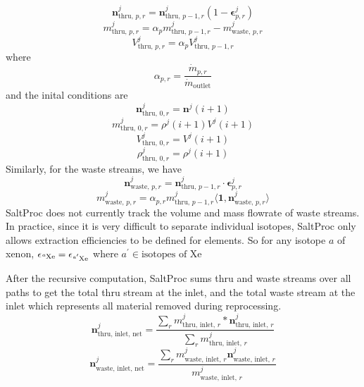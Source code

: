\begin{equation}
    \mathbf{n}^{j}_{\text{thru, }p,r} = \mathbf{n}^{j}_{\text{thru, }p-1,r} (1 - \mathbf{\epsilon}^{j}_{p,r})
\end{equation}
\begin{equation}
    m^{j}_{\text{thru, } p,r} = \alpha_{p} m^{j}_{\text{thru, }p-1,r} - m^{j}_{\text{waste, }p,r}
\end{equation}
\begin{equation}
    V^{j}_{\text{thru, }p,r} = \alpha_{p}V^{j}_{\text{thru, }p-1,r}
\end{equation}
where 
\begin{equation}
    \alpha_{p,r} = \frac{\dot{m}_{p,r}}{\dot{m}_{\text{outlet}}}
\end{equation}
and the inital conditions are 
\begin{equation}
    \mathbf{n}^{j}_{\text{thru, }0,r} = \mathbf{n}^{j}(i+1)
\end{equation}
\begin{equation}
    m^{j}_{\text{thru, }0,r} = \rho^{j}(i+1)V^{j}(i+1)
\end{equation}
\begin{equation}
    V^{j}_{\text{thru, }0,r} = V^{j}(i+1)
\end{equation}
\begin{equation}
    \rho^{j}_{\text{thru, }0,r} = \rho^{j}(i+1)
\end{equation}
Similarly, for the waste streams, we have
\begin{equation}
    \mathbf{n}^{j}_{\text{waste, }p,r} = \mathbf{n}^{j}_{\text{thru, }p-1,r} \cdot \mathbf{\epsilon}^{j}_{p,r}
\end{equation}
\begin{equation}
    m^{j}_{\text{waste, }p,r} = \alpha_{p,r} m^{j}_{\text{thru, }p-1,r} \langle\mathbf{1},\mathbf{n}^{j}_{\text{waste, }p,r}\rangle
\end{equation}
SaltProc does not currently track the volume and mass flowrate of waste streams.
In practice, since it is very difficult to separate individual isotopes,
SaltProc only allows extraction efficiencies to be defined for elements. So for
any isotope $a$ of xenon,
$\epsilon_{\ce{^{a}Xe}} = \epsilon_{\ce{^{a^{\prime}}Xe}}$  where
$a^{\prime} \in \text{isotopes of Xe}$

After the recursive computation, SaltProc sums thru and waste streams over all
paths to get the total thru stream at the inlet, and the total waste stream at
the inlet which represents all material removed during reprocessing.
\begin{equation}
    \mathbf{n}^{j}_{\text{thru, inlet, net}} = \frac{\sum_{r} m^{j}_{\text{thru, inlet, }r} * \mathbf{n}^{j}_{\text{thru, inlet, }r}}{\sum_{r} m^{j}_{\text{thru, inlet, }r}}
\end{equation}
\begin{equation}
    \mathbf{n}^{j}_{\text{waste, inlet, net}} = \frac{\sum_{r} m^{j}_{\text{waste, inlet, }r} \mathbf{n}^{j}_{\text{waste, inlet, }r}}{m^{j}_{\text{waste, inlet, }r}}
\end{equation}


